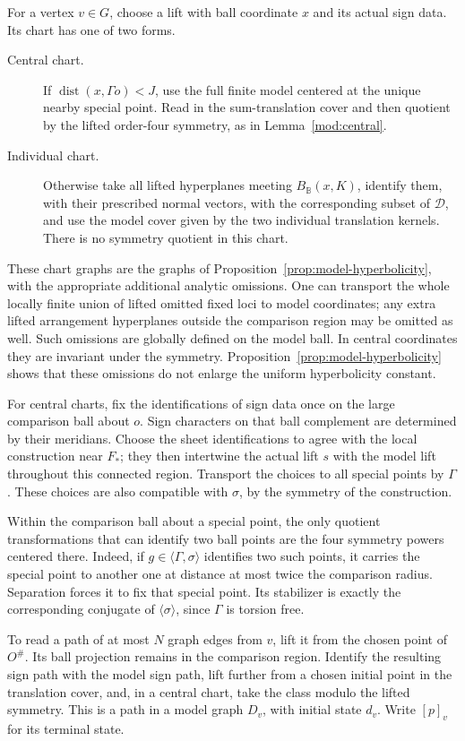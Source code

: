 \documentclass[11pt,reqno]{amsart}
\numberwithin{equation}{section}
\theoremstyle{definition}
\theoremstyle{remark}
\begin{document}
For a vertex $v\in G$, choose a lift with ball coordinate $x$ and its
actual sign data.  Its chart has one of two forms.
\begin{description}
\item[Central chart.] If $\operatorname{dist}(x,\Gamma o)<J$, use the full finite
model centered at the unique nearby special point.  Read in the
sum-translation cover and then quotient by the lifted order-four
symmetry, as in Lemma~\ref{mod:central}.
\item[Individual chart.] Otherwise take all lifted hyperplanes
meeting $B_{\mathbb B}(x,K)$, identify them, with their prescribed normal
vectors, with the corresponding subset of $\mathcal D$, and use the model
cover given by the two individual translation kernels.  There is no
symmetry quotient in this chart.
\end{description}
These chart graphs are the graphs of
Proposition~\ref{prop:model-hyperbolicity}, with the appropriate
additional analytic omissions.  One can transport the whole locally
finite union of lifted omitted fixed loci to model coordinates; any
extra lifted arrangement hyperplanes outside the comparison region
may be omitted as well.  Such omissions are globally defined on the
model ball.  In central coordinates they are invariant under the
symmetry.  Proposition~\ref{prop:model-hyperbolicity} shows that these
omissions do not enlarge the uniform hyperbolicity constant.

For central charts, fix the identifications of sign data once on the
large comparison ball about $o$.  Sign characters on that ball
complement are determined by their meridians.  Choose the sheet
identifications to agree with the local construction near $F_*$;
they then intertwine the actual lift $s$ with the model lift
throughout this connected region.  Transport the choices to all
special points by $\Gamma$.  These choices are also compatible with
$\sigma$, by the symmetry of the construction.

Within the comparison ball about a special point, the only quotient
transformations that can identify two ball points are the four
symmetry powers centered there.  Indeed, if $g\in\langle\Gamma,
\sigma\rangle$ identifies two such points, it carries the special
point to another one at distance at most twice the comparison radius.
Separation forces it to fix that special point.  Its stabilizer is
exactly the corresponding conjugate of $\langle\sigma\rangle$,
since $\Gamma$ is torsion free.

To read a path of at most $N$ graph edges from $v$, lift it from the
chosen point of $O^\#$.  Its ball projection remains in the comparison
region.  Identify the resulting sign path with the model sign path,
lift further from a chosen initial point in the translation cover,
and, in a central chart, take the class modulo the lifted symmetry.
This is a path in a model graph $D_v$, with initial state $d_v$.
Write $[p]_v$ for its terminal state.
\end{document}
